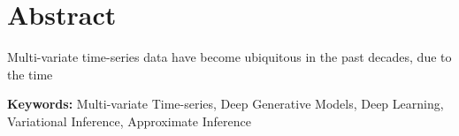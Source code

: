 \section*{Abstract}


Multi-variate time-series data have become ubiquitous in the past decades,
due to the time

\vfill

\textbf{\Large Keywords:} Multi-variate Time-series, Deep
Generative Models, Deep Learning, Variational Inference,
Approximate Inference

